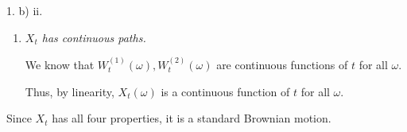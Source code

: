 \documentclass[11pt,a4paper]{article}
\begin{document}
\begin{answer}{1. b) ii.}
\begin{enumerate}
    \item \textit{$X_t$ has continuous paths.}
    \par We know that $W_t^{(1)}(\omega),W_t^{(2)}(\omega)$ are continuous functions of $t$ for all $\omega$.
    \par Thus, by linearity, $X_t(\omega)$ is a continuous function of $t$ for all $\omega$.
  \end{enumerate}
  Since $X_t$ has all four properties, it is a standard Brownian motion.
\end{answer}
\end{document}
